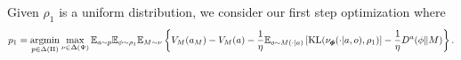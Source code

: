 Given $\rho_1$ is a uniform distribution, we consider our first step optimization where
\begin{align}
    p_1 = \operatorname*{argmin}_{p \in \Delta(\Pi)} \max_{\nu \in \Delta(\Psi)} \mathbb{E}_{a\sim p} \mathbb{E}_{\phi\sim \rho_1} \mathbb{E}_{M\sim \nu} \left\{V_M(a_M) - V_M (a) -\frac{1}{\eta} \mathbb{E}_{o\sim M(\cdot|a)}\left[\text{KL}(\nu_{\pmb{\phi}}(\cdot|a, o), \rho_1)\right] - \frac{1}{\eta} D^{a}(\phi\| M) \right\}. 
\label{eq:dec-our}
\end{align}
%
%
